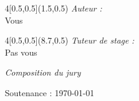 \begin{titlepage}
\begin{center}
\begin{textblock}{4}[0.5,0.5](1.5,0.5)
    {\Large \emph{Auteur :}}\\[0.3cm]
    {\large Vous}
\end{textblock}
  
\begin{textblock}{4}[0.5,0.5](8.7,0.5)
    {\Large \emph{Tuteur de stage :}}\\[0.3cm]
    {\large Pas vous}
\end{textblock}

\vspace{4cm}

{\Large \emph{Composition du jury}}\\[0.8cm]




\vspace{7cm}

{Soutenance : 1970-01-01}
\end{center}

\end{titlepage}